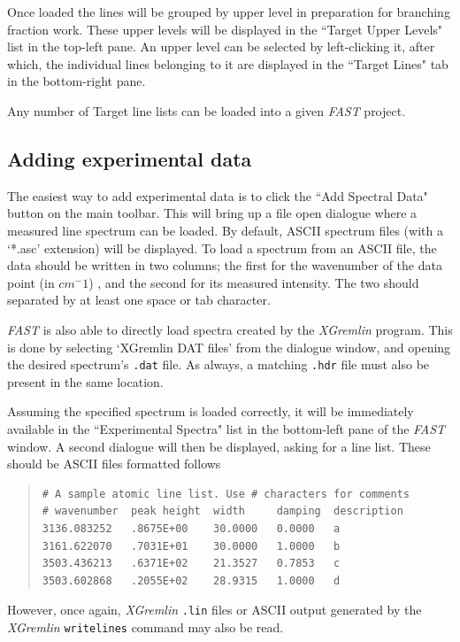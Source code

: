 \documentclass[a4paper,12pt]{report}
\newcommand{\fast}{\emph{FAST} }
\newcommand{\xgremlin}{\emph{XGremlin} }
\begin{document}
Once loaded the lines will be grouped by upper level in preparation for branching fraction work. These upper levels will be displayed in the ``Target Upper Levels" list in the top-left pane. An upper level can be selected by left-clicking it, after which, the individual lines belonging to it are displayed in the ``Target Lines" tab in the bottom-right pane.

Any number of Target line lists can be loaded into a given \fast project.

\subsection{Adding experimental data}
\label{section:addexptdata}
The easiest way to add experimental data is to click the ``Add Spectral Data" button on the main toolbar. This will bring up a file open dialogue where a measured line spectrum can be loaded. By default, ASCII spectrum files (with a `*.asc' extension) will be displayed. To load a spectrum from an ASCII file, the data should be written in two columns; the first for the wavenumber of the data point (in $cm^-1$) , and the second for its measured intensity. The two should separated by at least one space or tab character. 

\fast is also able to directly load spectra created by the \emph{XGremlin} program. This is done by selecting `XGremlin DAT files' from the dialogue window, and opening the desired spectrum's \verb|.dat| file. As always, a matching \verb|.hdr| file must also be present in the same location. 

Assuming the specified spectrum is loaded correctly, it will be immediately available in the ``Experimental Spectra" list in the bottom-left pane of the \fast window. A second dialogue will then be displayed, asking for a line list. These should be ASCII files formatted follows

\begin{quote}
\begin{verbatim}
# A sample atomic line list. Use # characters for comments
# wavenumber  peak height  width     damping  description
3136.083252   .8675E+00    30.0000   0.0000   a
3161.622070   .7031E+01    30.0000   1.0000   b
3503.436213   .6371E+02    21.3527   0.7853   c
3503.602868   .2055E+02    28.9315   1.0000   d
\end{verbatim}
\end{quote}

However, once again, \xgremlin \verb|.lin| files or ASCII output generated by the \xgremlin \verb|writelines| command may also be read.
\end{document}
